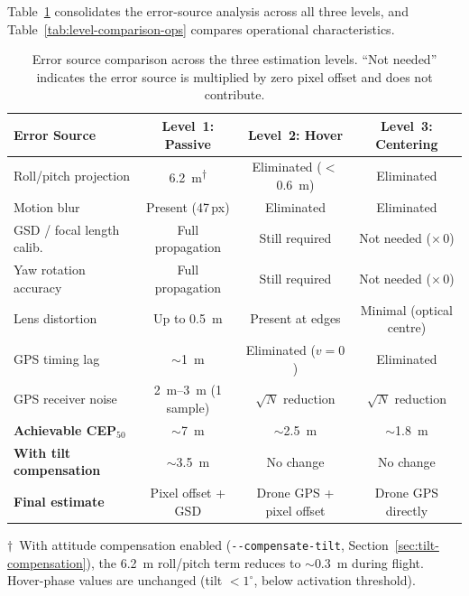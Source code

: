 Table~\ref{tab:hover-vs-centering} consolidates the error-source analysis across all three levels, and Table~\ref{tab:level-comparison-ops} compares operational characteristics.

\begin{table}[H]
  \centering
  \caption{Error source comparison across the three estimation levels.  ``Not needed'' indicates the error source is multiplied by zero pixel offset and does not contribute.}
  \label{tab:hover-vs-centering}
  \begin{tabularx}{\linewidth}{Xccc}
    \toprule
    \textbf{Error Source} & \textbf{Level~1: Passive} & \textbf{Level~2: Hover} & \textbf{Level~3: Centering} \\
    \midrule
    Roll/pitch projection      & \SI{6.2}{\metre}\textsuperscript{$\dagger$}   & Eliminated ($<$\SI{0.6}{\metre})  & Eliminated \\
    Motion blur                & Present (47\,px)   & Eliminated       & Eliminated \\
    GSD / focal length calib.  & Full propagation    & Still required   & Not needed ($\times\,0$) \\
    Yaw rotation accuracy      & Full propagation    & Still required   & Not needed ($\times\,0$) \\
    Lens distortion            & Up to \SI{0.5}{\metre} & Present at edges & Minimal (optical centre) \\
    GPS timing lag             & $\sim$\SI{1}{\metre} & Eliminated ($v\!=\!0$) & Eliminated \\
    GPS receiver noise         & \SIrange{2}{3}{\metre} (1 sample) & $\sqrt{N}$ reduction & $\sqrt{N}$ reduction \\
    \midrule
    \textbf{Achievable CEP$_{50}$} & $\sim$\SI{7}{\metre} & $\sim$\SI{2.5}{\metre} & $\sim$\SI{1.8}{\metre} \\
    \textbf{With tilt compensation} & $\sim$\SI{3.5}{\metre} & No change & No change \\
    \textbf{Final estimate}    & Pixel offset + GSD  & Drone GPS + pixel offset & Drone GPS directly \\
    \bottomrule
  \end{tabularx}
  \par\vspace{2pt}
  {\footnotesize $\dagger$~With attitude compensation enabled (\texttt{-{}-compensate-tilt}, Section~\ref{sec:tilt-compensation}), the \SI{6.2}{\metre} roll/pitch term reduces to $\sim$\SI{0.3}{\metre} during flight.  Hover-phase values are unchanged (tilt $< 1^{\circ}$, below activation threshold).}
\end{table}

